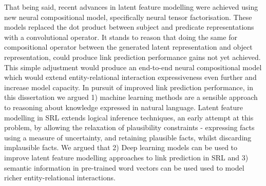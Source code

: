 That being said, recent advances in latent feature modelling were achieved using new neural compositional model, specifically neural tensor factorisation. These models replaced the dot product between subject and predicate representations with a convolutional operator. It stands to reason that doing the same for compositional operator between the generated latent representation and object representation, could produce link prediction performance gains not yet achieved. This simple adjustment would produce an end-to-end neural compositional model which would extend entity-relational interaction expressiveness even further and increase model capacity. In pursuit of improved link prediction performance, in this dissertation we argued 1) machine learning methods are a sensible approach to reasoning about knowledge expressed in natural language. Latent feature modelling in SRL extends logical inference techniques, an early attempt at this problem, by allowing the relaxation of plausibility constraints - expressing facts using a measure of uncertainty, and retaining plausible facts, whilst discarding implausible facts. We argued that 2) Deep learning models can be used to improve latent feature modelling approaches to link prediction in SRL and 3) semantic information in pre-trained word vectors can be used used to model richer entity-relational interactions. \newline
